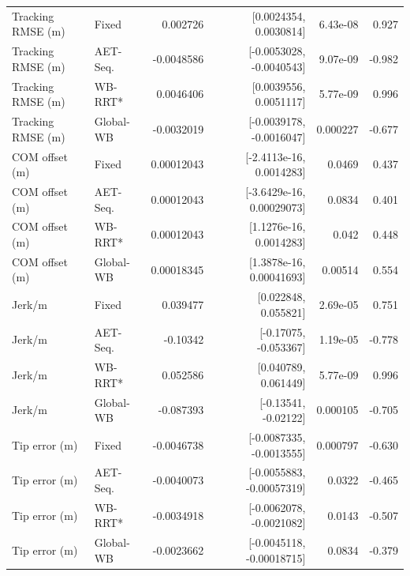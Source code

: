 \begin{table}[t]
\begin{tabular}{llrrrr}
\addlinespace
Tracking RMSE (m) & Fixed & 0.002726 & [0.0024354, 0.0030814] & 6.43e-08 & 0.927 \\
Tracking RMSE (m) & AET-Seq. & -0.0048586 & [-0.0053028, -0.0040543] & 9.07e-09 & -0.982 \\
Tracking RMSE (m) & WB-RRT* & 0.0046406 & [0.0039556, 0.0051117] & 5.77e-09 & 0.996 \\
Tracking RMSE (m) & Global-WB & -0.0032019 & [-0.0039178, -0.0016047] & 0.000227 & -0.677 \\
\addlinespace
COM offset (m) & Fixed & 0.00012043 & [-2.4113e-16, 0.0014283] & 0.0469 & 0.437 \\
COM offset (m) & AET-Seq. & 0.00012043 & [-3.6429e-16, 0.00029073] & 0.0834 & 0.401 \\
COM offset (m) & WB-RRT* & 0.00012043 & [1.1276e-16, 0.0014283] & 0.042 & 0.448 \\
COM offset (m) & Global-WB & 0.00018345 & [1.3878e-16, 0.00041693] & 0.00514 & 0.554 \\
\addlinespace
Jerk/m & Fixed & 0.039477 & [0.022848, 0.055821] & 2.69e-05 & 0.751 \\
Jerk/m & AET-Seq. & -0.10342 & [-0.17075, -0.053367] & 1.19e-05 & -0.778 \\
Jerk/m & WB-RRT* & 0.052586 & [0.040789, 0.061449] & 5.77e-09 & 0.996 \\
Jerk/m & Global-WB & -0.087393 & [-0.13541, -0.02122] & 0.000105 & -0.705 \\
\addlinespace
Tip error (m) & Fixed & -0.0046738 & [-0.0087335, -0.0013555] & 0.000797 & -0.630 \\
Tip error (m) & AET-Seq. & -0.0040073 & [-0.0055883, -0.00057319] & 0.0322 & -0.465 \\
Tip error (m) & WB-RRT* & -0.0034918 & [-0.0062078, -0.0021082] & 0.0143 & -0.507 \\
Tip error (m) & Global-WB & -0.0023662 & [-0.0045118, -0.00018715] & 0.0834 & -0.379 \\
\bottomrule
\end{tabular}
\end{table}
